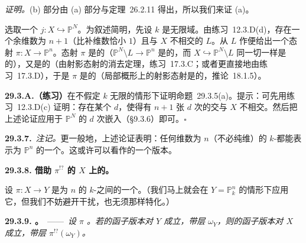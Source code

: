 \emph{证明。}\quad (b) 部分由 (a) 部分与\trMiracleFlat{}定理~26.2.11 得出，所以我们来证 (a)。

选取一个\trClosedEmbedding{} $j\colon X\hookrightarrow\mathbb{P}^N$。为叙述简明，先设 $k$ 是无限域。由\mbox{练习~12.3.D(d)}，存在一个余维数为 $n+1$（比补维数恰小 $1$）且与 $X$ 不相交的\trLinearSpace{} $L$。从 $L$ 作\trProjection{}便给出一个态射 $\pi\colon X\to\mathbb{P}^n$。态射 $\pi$ 是\trAffine{}的（$\mathbb{P}^N\setminus L\to\mathbb{P}^n$ 是\trAffine{}的，而\trClosedEmbedding{} $X\hookrightarrow\mathbb{P}^N\setminus L$ 同一切\trClosedEmbedding{}一样是\trAffine{}的），又是\trProjective{}的（由射影态射的消去定理，\mbox{练习~17.3.C}；或者更直接地由\mbox{练习~17.3.D}），于是 $\pi$ 是\trFinite{}的（局部\trNoether{}概形上的射影\trAffine{}态射是\trFinite{}的，\mbox{推论~18.1.5}）。

\textbf{29.3.A.（练习）}\quad 在不假定 $k$ 无限的情形下证明\mbox{命题~29.3.5(a)}。提示：可先用\mbox{练习~12.3.D(c)} 证明：存在某个 $d$，使得有 $n+1$ 张 $d$ 次\trHypersurface{}的交与 $X$ 不相交。然后把上述论证应用于 $\mathbb{P}^N$ 的 $d$ 次\trVeronese{}嵌入（\S9.3.6）即可。\hfill$\square$

\textbf{29.3.7.}\ \emph{注记。}\quad 更一般地，上述论证表明：任何维数为 $n$（不必纯维）的\trProjective{} $k$-\trScheme{}都能表示为 $\mathbb{P}^n$ 的一个\trFinite\trCover。这或许可以看作\trNoetherNormalization{}的一个\trProjective{}版本。

\textbf{29.3.8. 借助 $\pi^{!?}$ 的 $X$ 上的\trSerreDuality。}

设 $\pi\colon X\to Y$ 是\trPureDimension{}为 $n$ 的\trProjective{} $k$-\trScheme{}之间的一个\trFinite\trMorphism。（我们马上就会在 $Y=\mathbb{P}^n_k$ 的情形下应用它，但我们不妨避开干扰，也无须那样特化。）

\textbf{29.3.9. \trhProposition。}\ ——\ \emph{设 $\pi$ \trFlat。若\trVectorBundle{}的函子版本\trSerreDuality{}对 $Y$ 成立，带\trCanonical{}层 $\omega_Y$，则\trVectorBundle{}的函子版本\trSerreDuality{}对 $X$ 成立，带\trCanonical{}层 $\pi^{!?}(\omega_Y)$。}

